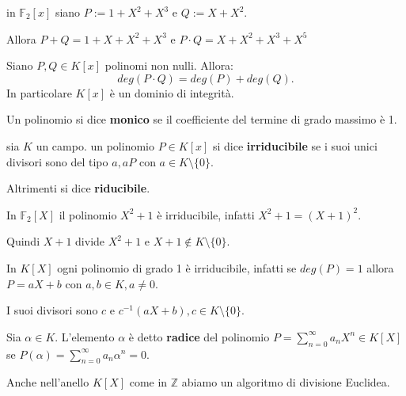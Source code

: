 \documentclass[../main.tex]{subfiles}
\begin{document}
\begin{example}
    in $\mathbb{F}_2[x]$ siano $P := 1 + X^2 + X^3$ e $Q:= X + X^2$.

    Allora $P+Q = 1 + X + X^2 + X^3$ e $P \cdot Q = X + X^2 + X^3 + X^5$
\end{example}

\begin{proposition}
    Siano $P,Q \in K[x]$ polinomi non nulli. Allora:
    \begin{equation*}
        deg(P \cdot Q) = deg(P) + deg(Q).
    \end{equation*}
    In particolare $K[x]$ è un dominio di integrità.
\end{proposition}

\begin{definition}
    Un polinomio si dice \textbf{monico} se il coefficiente del termine di grado massimo è 1.
\end{definition}

\begin{definition}
    sia $K$ un campo. un polinomio $P \in K[x]$ si dice \textbf{irriducibile} se i suoi unici divisori sono del tipo $a, aP$ con $a \in K \setminus \{0\}$.

    Altrimenti si dice \textbf{riducibile}.
\end{definition}

\begin{example}
    In $\mathbb{F}_2[X]$ il polinomio $X^2 + 1$ è irriducibile, infatti $X^2 + 1 = (X + 1)^2$.

    Quindi $X + 1$ divide $X^2 + 1$ e $X + 1 \notin K \setminus \{0\}$.
\end{example}

\begin{example}
    In $K[X]$ ogni polinomio di grado 1 è irriducibile, infatti se $deg(P) = 1$ allora $P = aX + b$ con $a,b \in K, a \neq 0$.

    I suoi divisori sono $c$ e $c^{-1} (aX + b), c \in K \setminus \{0\}$.
\end{example}

\begin{definition}
    Sia $\alpha \in K$. L'elemento $\alpha$ è detto \textbf{radice} del polinomio $P = \sum_{n=0}^{\infty} a_n X^n \in K[X]$ se $P(\alpha) = \sum_{n=0}^{\infty} a_n \alpha^n = 0$.
\end{definition}

Anche nell'anello $K[X]$ come in $\mathbb{Z}$ abiamo un algoritmo di divisione Euclidea.
\end{document}
